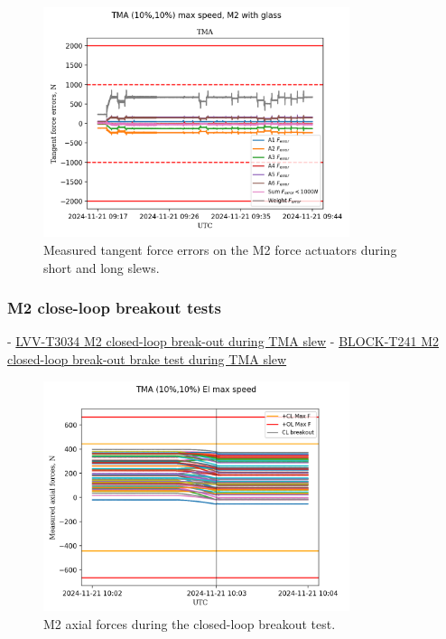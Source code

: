 \begin{figure}
    \centering
    \includegraphics[width=0.8\textwidth]{spa/M2_short_long_slews_tangent_force_errors_10.png}
    \caption{Measured tangent force errors on the M2 force actuators during short and long slews.}
    \label{fig:m2_short_long_slews_tangent_errors}
    \end{figure}


\subsubsection{M2 close-loop breakout tests}
\label{subsubsec:m2_close_loop_breakout_tests}

\begin{itemize}
    - \href{https://rubinobs.atlassian.net/projects/LVV?selectedItem=com.atlassian.plugins.atlassian-connect-plugin:com.kanoah.test-manager__main-project-page#!/v2/testCase/LVV-T3034}{LVV-T3034 M2 closed-loop break-out during TMA slew}
    - \href{https://rubinobs.atlassian.net/projects/BLOCK?selectedItem=com.atlassian.plugins.atlassian-connect-plugin:com.kanoah.test-manager__main-project-page#!/v2/testCase/BLOCK-T241}{BLOCK-T241 M2 closed-loop break-out brake test during TMA slew}
\end{itemize}

\begin{figure}
    \centering
    \includegraphics[width=0.8\textwidth]{spa/M2_cl_breakout_10_axial_force.png}
    \caption{M2 axial forces during the closed-loop breakout test.}
    \label{fig:m2_closed_loop_breakout_axial_force}
    \end{figure}

